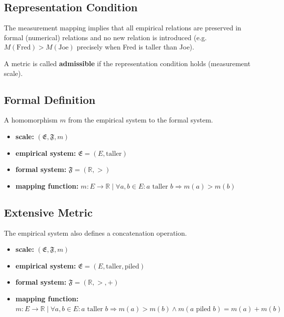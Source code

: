 
\subsection{Representation Condition}

The measurement mapping implies that all empirical relations are preserved in formal
(numerical) relations and no new relation is introduced
(e.g.\ $M(\text{Fred}) > M(\text{Joe})$ precisely when Fred is taller than Joe).

A metric is called \textbf{admissible} if the representation condition holds (measurement scale).

\subsection{Formal Definition}

A homomorphism $m$ from the empirical system to the formal system.
\begin{itemize}
  \item \textbf{scale:} $(\mathfrak{E},\mathfrak{F},m)$
  \item \textbf{empirical system:} $\mathfrak{E}=(E,\text{taller})$
  \item \textbf{formal system:} $\mathfrak{F}=(\mathbb{R},>)$
  \item \textbf{mapping function:} $m:E\rightarrow\mathbb{R} \mid \forall a,b\in E: a \text{ taller } b \Rightarrow m(a)>m(b)$
\end{itemize}

\subsection{Extensive Metric}

The empirical system also defines a concatenation operation.
\begin{itemize}
  \item \textbf{scale:} $(\mathfrak{E},\mathfrak{F},m)$
  \item \textbf{empirical system:} $\mathfrak{E} = (E, \text{taller}, \text{piled})$
  \item \textbf{formal system:} $\mathfrak{F}=(\mathbb{R},>,+)$
  \item \textbf{mapping function:} $m:E\rightarrow\mathbb{R} \mid \forall a,b\in E: a \text{ taller } b \Rightarrow m(a)>m(b) \wedge m(a \text{ piled } b)=m(a)+m(b)$
\end{itemize}

